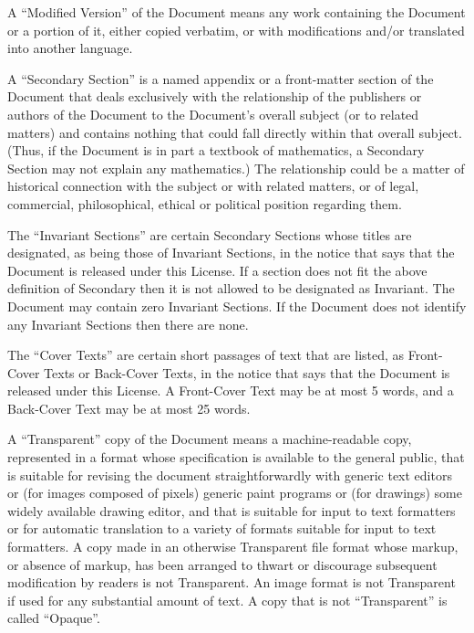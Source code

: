{\tiny{}A \textquotedblleft Modified Version\textsf{''} of the Document means
any work containing the Document or a portion of it, either copied
verbatim, or with modifications and/or translated into another language.}{\tiny\par}

{\tiny{}A \textquotedblleft Secondary Section\textsf{''} is a named appendix
or a front-matter section of the Document that deals exclusively with
the relationship of the publishers or authors of the Document to the
Document's overall subject (or to related matters) and contains nothing
that could fall directly within that overall subject. (Thus, if the
Document is in part a textbook of mathematics, a Secondary Section
may not explain any mathematics.) The relationship could be a matter
of historical connection with the subject or with related matters,
or of legal, commercial, philosophical, ethical or political position
regarding them.}{\tiny\par}

{\tiny{}The \textquotedblleft Invariant Sections\textsf{''} are certain Secondary
Sections whose titles are designated, as being those of Invariant
Sections, in the notice that says that the Document is released under
this License. If a section does not fit the above definition of Secondary
then it is not allowed to be designated as Invariant. The Document
may contain zero Invariant Sections. If the Document does not identify
any Invariant Sections then there are none.}{\tiny\par}

{\tiny{}The \textquotedblleft Cover Texts\textsf{''} are certain short passages
of text that are listed, as Front-Cover Texts or Back-Cover Texts,
in the notice that says that the Document is released under this License.
A Front-Cover Text may be at most 5 words, and a Back-Cover Text may
be at most 25 words.}{\tiny\par}

{\tiny{}A \textquotedblleft Transparent\textsf{''} copy of the Document means
a machine-readable copy, represented in a format whose specification
is available to the general public, that is suitable for revising
the document straightforwardly with generic text editors or (for images
composed of pixels) generic paint programs or (for drawings) some
widely available drawing editor, and that is suitable for input to
text formatters or for automatic translation to a variety of formats
suitable for input to text formatters. A copy made in an otherwise
Transparent file format whose markup, or absence of markup, has been
arranged to thwart or discourage subsequent modification by readers
is not Transparent. An image format is not Transparent if used for
any substantial amount of text. A copy that is not \textquotedblleft Transparent\textsf{''}
is called \textquotedblleft Opaque\textsf{''}.}{\tiny\par}

